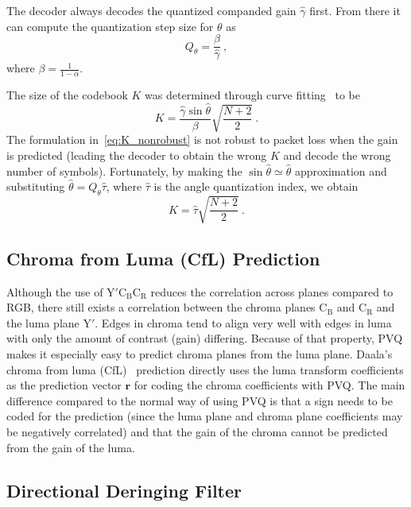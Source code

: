 \documentclass[english,conference,10pt]{IEEEtran}
\begin{document}
The decoder always decodes the quantized companded gain $\hat{\gamma}$
first. From there it can compute the quantization step size for $\theta$ as
\begin{equation}
Q_\theta = \frac{\beta}{\hat{\gamma}}\ ,
\end{equation}
where $\beta = \frac{1}{1-\alpha}$.

The size of the codebook $K$ was determined through curve
fitting~\cite{valin2015spie} to be
\begin{equation}
K = \frac{\hat{\gamma}\sin\hat{\theta}}{\beta}\sqrt{\frac{N+2}{2}}\ .
\label{eq:K_nonrobust}
\end{equation}
The formulation in~\cref{eq:K_nonrobust} is not robust to packet loss when
the gain is predicted (leading the decoder to obtain the wrong $K$ and decode
the wrong number of symbols). Fortunately, by making the $\sin{\hat{\theta}}
\simeq \hat{\theta}$ approximation and substituting $\hat{\theta} =
Q_\theta\hat{\tau}$, where $\hat{\tau}$ is the angle quantization index, we obtain
\begin{equation}
K = \hat{\tau} \sqrt{\frac{N+2}{2}}\ .
\end{equation}


\subsection{Chroma from Luma (CfL) Prediction}

Although the use of $\mathrm{Y'C_BC_R}$ reduces the correlation across planes
compared to RGB, there still exists a correlation between the chroma planes
$\mathrm{C_B}$ and $\mathrm{C_R}$ and the luma plane $\mathrm{Y'}$. Edges in
chroma tend to
align very well with edges in luma with only the amount of contrast (gain) differing.
Because of that property, PVQ makes it especially easy to predict
chroma planes from the luma plane. Daala's chroma from luma (CfL)~\cite{egge2015spie}
prediction directly uses the luma transform coefficients as the prediction vector
$\mathbf{r}$ for coding the chroma coefficients with PVQ\@. The main difference compared
to the normal way of using PVQ is that a sign needs to be coded for the prediction
(since the luma plane and chroma plane coefficients may be negatively correlated) and
that the gain of the chroma cannot be predicted from the gain of the luma.


\subsection{Directional Deringing Filter}
\label{sec:deringing}
\end{document}
